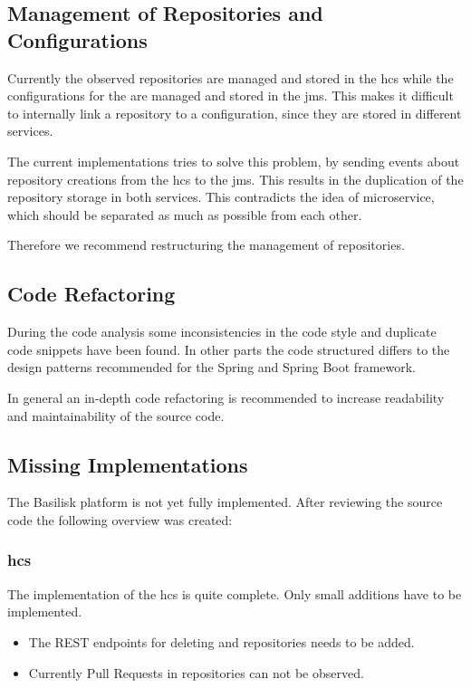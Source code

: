 \subsection{Management of Repositories and Configurations}
\label{sec:management_repo_config}
Currently the observed repositories are managed and stored in the \ac{hcs} while the configurations for the \tsp{} are managed and stored in the \ac{jms}.
This makes it difficult to internally link a repository to a \ts{} configuration, since they are stored in different services.

The current implementations tries to solve this problem, by sending events about repository creations from the \ac{hcs} to the \ac{jms}.
This results in the duplication of the repository storage in both services.
This contradicts the idea of microservice, which should be separated as much as possible from each other.

Therefore we recommend restructuring the management of repositories.


\subsection{Code Refactoring}
\label{sec:code_refactor}
During the code analysis some inconsistencies in the code style and duplicate code snippets have been found.
In other parts the code structured differs to the design patterns recommended for the Spring and Spring Boot framework.

In general an in-depth code refactoring is recommended to increase readability and maintainability of the source code. 


\subsection{Missing Implementations}
The Basilisk platform is not yet fully implemented.
After reviewing the source code the following overview was created:

\subsubsection{\acl{hcs}}
The implementation of the \acl{hcs} is quite complete.
Only small additions have to be implemented.

\begin{itemize}
	\item The REST endpoints for deleting \gh{} and \dockh{} repositories needs to be added.
	
	\item Currently Pull Requests in \gh{} repositories can not be observed.
\end{itemize}


